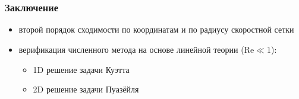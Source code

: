 \documentclass[ucs]{beamer}
\begin{document}
\section*{}
\begin{frame}
	\frametitle{Заключение}
	\begin{itemize}
		\item \alert{второй порядок} сходимости по координатам и по радиусу скоростной сетки \\
		\item \alert{верификация} численного метода на основе линейной теории (\(\mathrm{Re}\ll1\)):
		\begin{itemize}
			\item 1D решение задачи Куэтта
			\item 2D решение задачи Пуазёйля
		\end{itemize}
	\end{itemize}
\end{frame}
\end{document}
